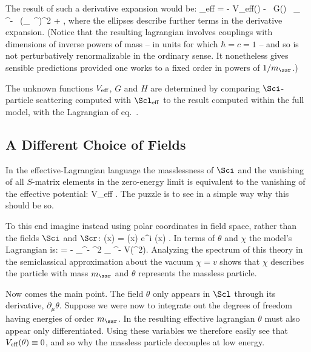 The result of such a derivative expansion would be:
%
\bg
\label{dexp1}
\Scl_{\rm eff} = - V_{\rm eff}(\Sci) - \; \hf \, G(\Sci)
\, \partial_\mu \Sci \, \partial^\mu \Sci - 
\, (\partial_\mu \Sci \, \partial^\mu \Sci )^2 + \cdots,
\nd
%
where the ellipses describe further terms in the derivative
expansion. (Notice that the resulting lagrangian involves 
couplings with dimensions of inverse powers of mass --
in units for which $\hbar = c = 1$ -- and so is not
perturbatively renormalizable in the ordinary sense. It
nonetheless gives sensible predictions provided one works
to a fixed order in powers of $1/m_\ssr$.) 

The unknown functions $V_{\rm eff}$, $G$ and $H$ are 
determined by comparing $\Sci$-particle scattering computed
with $\Scl_{\rm eff}$ to the result computed within the full
model, with the Lagrangian of eq.~. 

\subsection{A Different Choice of Fields}

In the effective-Lagrangian language the masslessness of
$\Sci$ and the vanishing of all $S$-matrix elements in the 
zero-energy limit is equivalent to the vanishing of the effective 
potential: 
%
\bg
\label{Vis0}
V_{\rm eff} . 
\nd
%
The puzzle is to see in a simple way why this should be so.

To this end imagine instead using polar coordinates in field space,
rather than the fields $\Sci$ and $\Scr$:
%
\eq
\label{polcoords}
\phi(x) = \chi(x) \; e^{i \theta(x)} .
\eeq
%
In terms of $\theta$ and $\chi$ the model's Lagrangian is: 
%
\eq
\label{linpolcoords}
\Scl = - \partial_\mu \chi \partial^\mu \chi - \chi^2 \partial_\mu \theta
\partial^\mu \theta - V(\chi^2).
\eeq
%
Analyzing the spectrum of this theory in the semiclassical approximation
about the vacuum $\chi = v$ shows that $\chi$ describes the particle
with mass $m_\ssr$ and $\theta$ represents the massless particle. 

Now comes the main point. The field $\theta$ only appears in $\Scl$
through its derivative, $\partial_\mu \theta$. Suppose we were now
to integrate out the degrees of freedom having energies of order
$m_\ssr$. In the resulting effective lagrangian $\theta$ must also
appear only differentiated. Using these variables we therefore 
easily see that $V_{\rm eff}(\theta) \equiv 0$, and so why the
massless particle decouples at low energy.

